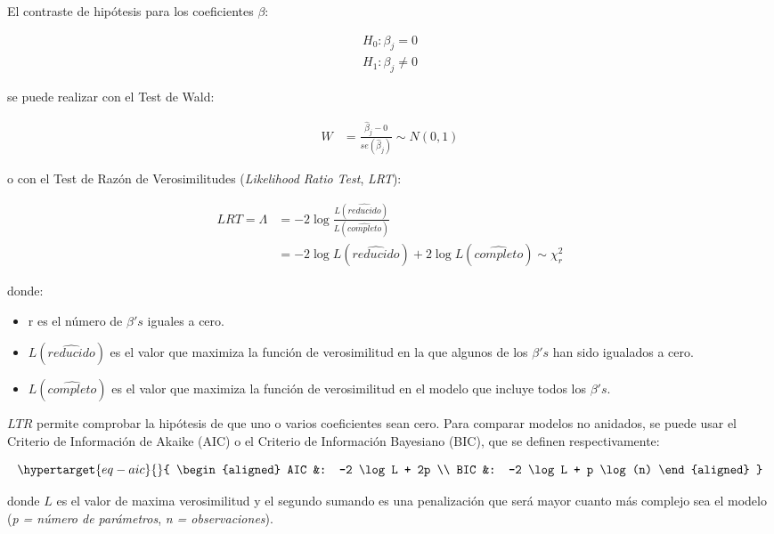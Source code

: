 \documentclass[
  12pt,
  a4paper,
  extrafontsizes,
  onecolumn,
  openright,
  table]{memoir}
\providecommand{\tightlist}{%
  \setlength{\itemsep}{0pt}\setlength{\parskip}{0pt}}\usepackage{longtable,booktabs,array}
\begin{document}
El contraste de hipótesis para los coeficientes \(\beta\):

\[
\begin{aligned}
H_0: \beta_j =  0 \\
H_1: \beta_j \ne  0
\end{aligned}
\]

se puede realizar con el Test de Wald:

\[
\begin{aligned}
W & = \frac{\hat\beta_j - 0}{se(\hat\beta_j)} \sim N(0,1)
\end{aligned}
\]

o con el Test de Razón de Verosimilitudes (\emph{Likelihood Ratio Test},
\emph{\gls{LRT}}):

\[
\begin{aligned}
LRT = \Lambda &= -2 \log \frac{L(\widehat{reducido})}{L(\widehat{completo})}\\
&= -2 \log L(\widehat{reducido}) + 2 \log L(\widehat{completo}) \sim \chi^2_r
\end{aligned}
\]

donde:

\begin{itemize}
\tightlist
\item
  r es el número de \(\beta's\) iguales a cero.
\item
  \(L(\widehat{reducido})\) es el valor que maximiza la función de
  verosimilitud en la que algunos de los \(\beta's\) han sido igualados
  a cero.
\item
  \(L(\widehat{completo})\) es el valor que maximiza la función de
  verosimilitud en el modelo que incluye todos los \(\beta's\).
\end{itemize}

\(LTR\) permite comprobar la hipótesis de que uno o varios coeficientes
sean cero. Para comparar modelos no anidados, se puede usar el Criterio
de Información de Akaike (AIC) o el Criterio de Información Bayesiano
(BIC), que se definen respectivamente:

\begin{equation}\protect\hypertarget{eq-aic}{}{
\begin{aligned}
AIC &: -2 \log L + 2p \\
BIC &: -2 \log L + p \log(n)
\end{aligned}
}\label{eq-aic}\end{equation}

donde \(L\) es el valor de maxima verosimilitud y el segundo sumando es
una penalización que será mayor cuanto más complejo sea el modelo
(\emph{p = número de parámetros}, \emph{n = observaciones}).
\end{document}

